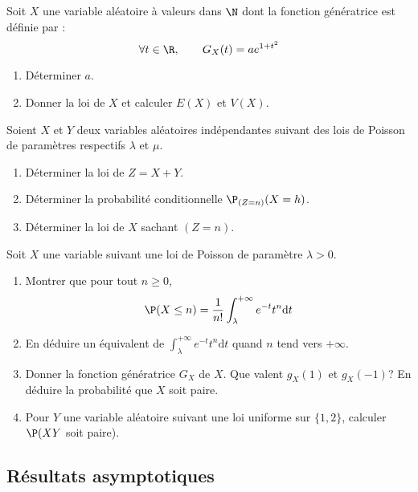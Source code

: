 \documentclass[a4paper,twoside,french,11pt]{VcCours}
\newcommand{\dt}{\text{d}t}
\begin{document}
\begin{Exercice}{} Soit $X$ une variable aléatoire \`a valeurs dans $\N$ dont la fonction génératrice est définie par :
$$\forall t\in\R,\qquad G_X(t)=ae^{1+t^2}$$

\begin{enumerate}
	\item Déterminer $a.$
	
	\item Donner la loi de $X$ et calculer $E(X)$ et $V(X).$
	
\end{enumerate}
\end{Exercice}



\begin{Exercice}{}
Soient $X$ et $Y$ deux variables aléatoires indépendantes suivant des lois de Poisson de paramètres respectifs $\lambda$ et $\mu$.
\begin{enumerate}
\item Déterminer la loi de $Z=X+Y$.
\item Déterminer la probabilité conditionnelle $\P_{(Z=n)}(X=h)$.
\item Déterminer la loi de $X$ sachant $(Z=n)$.
\end{enumerate}
\end{Exercice}




\begin{Exercice}{}
Soit $X$ une variable suivant une loi de Poisson de paramètre $\lambda>0$. 
\begin{enumerate}
\item Montrer que pour tout $n \geq 0$,
$$ \P(X \leq n) = \dfrac{1}{n!} \int_{\lambda}^{+ \infty} e^{-t} t^n \dt$$
\item En déduire un équivalent de $\int_{\lambda}^{+ \infty} e^{-t} t^n \dt$ quand $n$ tend vers $+ \infty$.
\item Donner la fonction génératrice $G_X$ de $X$. Que valent $g_X(1)$ et $g_X(-1)$? En déduire la probabilité que $X$ soit paire.
\item Pour $Y$ une variable aléatoire suivant une loi uniforme sur $\lbrace 1,2 \rbrace$, calculer $\P(XY$ soit paire).
\end{enumerate}
\end{Exercice}





\subsection{Résultats asymptotiques}
\end{document}
